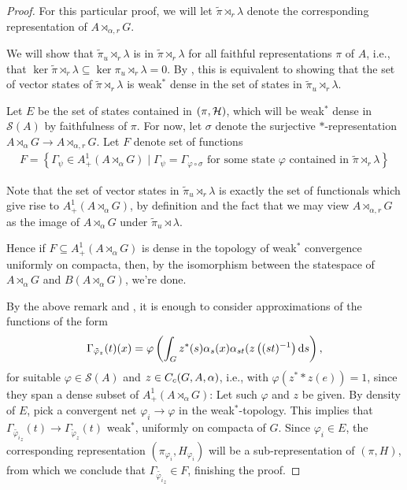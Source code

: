 \begin{proof}
For this particular proof, we will let $\tilde \pi \rtimes_r \lambda$ denote the corresponding representation of $A \rtimes_{\alpha,r}G$.

We will show that $\tilde \pi_u \rtimes_r \lambda$ is  in $\tilde \pi \rtimes_r \lambda$ for all faithful representations $\pi$ of $A$, i.e., that $\ker \tilde \pi \rtimes_r \lambda \subseteq \ker \pi_u \rtimes_r \lambda = 0$. By \cite[80]{dixmier1969c}, this is equivalent to showing that the set of vector states of $\tilde \pi \rtimes_r \lambda$ is weak$^*$ dense in the set of states in $\tilde \pi_u \rtimes_r \lambda$.

Let $E$ be the set of states contained in $(\pi,\mathcal{H})$, which will be weak$^*$ dense in $\mathcal{S}(A)$ by faithfulness of $\pi$. For now, let $\sigma$ denote the surjective $*$-representation $A \rtimes_\alpha G \to A \rtimes_{\alpha,r}G$. Let $F$ denote set of functions
\begin{align*}
	F = \left\{  \Gamma_\psi \in A_+^1(A\rtimes_\alpha G) \mid \Gamma_\psi = \Gamma_{\varphi \circ \sigma} \text{ for some state } \varphi \text{ contained in } \tilde \pi \rtimes_r \lambda \right\}
\end{align*}

Note that the set of vector states in $\tilde \pi_u \rtimes_r \lambda$ is exactly the set of functionals which give rise to $A_+^1(A \rtimes_\alpha G)$, by definition and the fact that we may view $A \rtimes_{\alpha,r} G$ as the image of $A \rtimes_\alpha G$ under $\tilde \pi_u \rtimes \lambda$.

Hence if $F \subseteq A_+^1(A \rtimes_\alpha G)$ is dense in the topology of weak$^*$ convergence uniformly on compacta, then, by the isomorphism between the statespace of $A \rtimes_\alpha G$ and $B(A \rtimes_\alpha G)$, we're done.

By the above remark and , it is enough to consider approximations of the functions of the form
\begin{align*}
	\Gamma_{\tilde \varphi_z}(t) (x) =\varphi\left( \int_G z^*(s) \alpha_s(x) \alpha_{st}(z\left( (st)^{-1} \right)\mathrm{d} s \right),
\end{align*}
for suitable $\varphi \in \mathcal{S}(A)$ and $z \in C_c(G,A,\alpha)$, i.e., with $\varphi(z^* \ast z(e)) = 1$, since they span a dense subset of $A_+^1(A \rtimes_\alpha G)$: Let such $\varphi$ and $z$ be given. By density of $E$, pick a convergent net $\varphi_i \to \varphi$ in the weak$^*$-topology. This implies that $\Gamma_{\tilde {\varphi_i}_z}(t) \to \Gamma_{\tilde \varphi_z}(t)$ weak$^*$, uniformly on compacta of $G$. Since $\varphi_i \in E$, the corresponding representation $(\pi_{\varphi_i},H_{\varphi_i})$ will be a sub-representation of $(\pi,H)$, from which we conclude that $\Gamma_{\tilde {\varphi_i}_z} \in F$, finishing the proof.
\end{proof}
